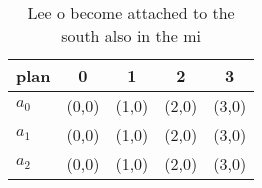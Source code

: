 \documentclass[a4paper]{article}
\begin{document}
\begin{table}
\begin{adjustbox}{width=0.5\columnwidth}
\begin{tabular}{|l|l|l|l|l|}
\hline
\textbf{plan} & \multicolumn{1}{c|}{\textbf{0}} & \multicolumn{1}{c|}{\textbf{1}} & \multicolumn{1}{c|}{\textbf{2}} & \multicolumn{1}{c|}{\textbf{3}} \\ \hline
\textbf{$a_0$}  & (0,0) & (1,0) & (2,0) & (3,0) \\ \hline
\textbf{$a_1$}  & (0,0) & (1,0) & (2,0) & (3,0) \\ \hline
\textbf{$a_2$}  & (0,0) & (1,0) & (2,0) & (3,0) \\ \hline
\end{tabular}
\end{adjustbox}
\caption{Lee o become attached to the south also in the mi
}
\end{table}
\end{document}
